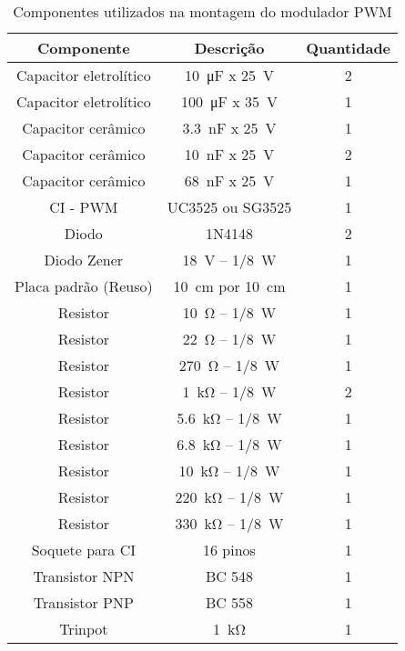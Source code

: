\begin{table}[!ht]
	\centering
	\caption{Componentes utilizados na montagem do modulador PWM}
	\label{tab:componentesPWM}
	\begin{tabular}{@{}ccc@{}}
		\toprule
		\textbf{Componente} & \textbf{Descrição} & \textbf{Quantidade} \\ \midrule	
			
		
		Capacitor eletrolítico          & \SI{10}{\micro\farad} x \SI{25}{\V}      & 2  \\		
		Capacitor eletrolítico          & \SI{100}{\micro\farad} x \SI{35}{\V}      & 1  \\
		Capacitor cerâmico          & \SI{3,3}{\nano\farad} x \SI{25}{\V}      & 1  \\
		Capacitor cerâmico          & \SI{10}{\nano\farad} x \SI{25}{\V}      & 2  \\
		Capacitor cerâmico          & \SI{68}{\nano\farad} x \SI{25}{\V}      & 1  \\
			CI - PWM      & UC3525 ou SG3525            & 1                   \\
				Diodo              & 1N4148             & 2                   \\
			Diodo   Zener          &  \SI{18}{\V} -- \SI{1/8}{\W}              & 1        \\
				Placa padrão (Reuso)        & \SI{10}{\cm} por \SI{10}{\cm}         & 1    \\
				Resistor       & \SI{10}{\ohm} -- \SI{1/8}{\W}    & 1    \\	
		 Resistor       & \SI{22}{\ohm} -- \SI{1/8}{\W}    & 1    \\
		  Resistor       & \SI{270}{\ohm} -- \SI{1/8}{\W}    & 1    \\		 
	    Resistor       & \SI{1}{\kilo\ohm} -- \SI{1/8}{\W}    & 2     \\	     
	      Resistor       & \SI{5.6}{\kilo\ohm} -- \SI{1/8}{\W}    & 1    \\
	       Resistor       & \SI{6.8}{\kilo\ohm} -- \SI{1/8}{\W}    & 1    \\
	        Resistor       & \SI{10}{\kilo\ohm} -- \SI{1/8}{\W}    & 1    \\ 
	       Resistor       & \SI{220}{\kilo\ohm} -- \SI{1/8}{\W}    & 1    \\
	        Resistor       & \SI{330}{\kilo\ohm} -- \SI{1/8}{\W}    & 1    \\ 	               
	          	Soquete para CI        & 16 pinos           & 1                   \\
	       	Transistor    NPN          & BC 548             & 1          \\
	       Transistor    PNP          & BC 558             & 1          \\
	          Trinpot       & \SI{1}{\kilo\ohm}    & 1    \\ \bottomrule	
	
	\end{tabular}
\end{table}
